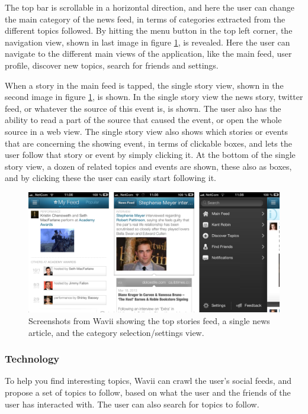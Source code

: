 The top bar is scrollable in a horizontal direction, and here the user can change the main category of the news feed, in terms of categories extracted from the different topics followed. By hitting the menu button in the top left corner, the navigation view, shown in last image in figure \ref{screenshots_wavii}, is revealed. Here the user can navigate to the different main views of the application, like the main feed, user profile, discover new topics, search for friends and settings.

When a story in the main feed is tapped, the single story view, shown in the second image in figure \ref{screenshots_wavii}, is shown. In the single story view the news story, twitter feed, or whatever the source of this event is, is shown. The user also has the ability to read a part of the source that caused the event, or open the whole source in a web view. The single story view also shows which stories or events that are concerning the showing event, in terms of clickable boxes, and lets the user follow that story or event by simply clicking it. At the bottom of the single story view, a dozen of related topics and events are shown, these also as boxes, and by clicking these the user can easily start following it.

\begin{figure}[!htbp]
\centering
\includegraphics[width=130mm]{GFX/screenshots/wavii.png}
\caption{Screenshots from Wavii showing the top stories feed, a single news article, and the category selection/settings view.}
\label{screenshots_wavii}
\end{figure}

\subsubsection{Technology}
To help you find interesting topics, Wavii can crawl the user's social feeds, and propose a set of topics to follow, based on what the user and the friends of the user has interacted with. The user can also search for topics to follow.

